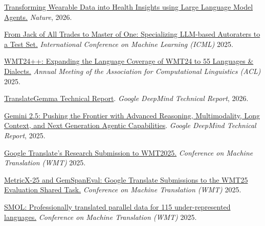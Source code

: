 
\href{https://www.nature.com/articles/s41467-025-67922-y_reference.pdf}{Transforming Wearable Data into Health Insights using Large Language Model Agents.} \emph{Nature}, 2026.

\href{https://openreview.net/pdf?id=Y0Kxvmjkmh}{From Jack of All Trades to Master of One: Specializing LLM-based Autoraters to a Test Set.} \emph{International Conference on Machine Learning (ICML)} 2025.

\href{https://aclanthology.org/2025.findings-acl.634.pdf}{WMT24++: Expanding the Language Coverage of WMT24 to 55 Languages \& Dialects.} \emph{Annual Meeting of the Association for Computational Linguistics (ACL)} 2025.

\href{https://arxiv.org/pdf/2601.09012}{TranslateGemma Technical Report}. \emph{Google DeepMind Technical Report}, 2026.

\href{https://arxiv.org/pdf/2507.06261}{Gemini 2.5: Pushing the Frontier with Advanced Reasoning, Multimodality, Long Context, and Next Generation Agentic Capabilities}. \emph{Google DeepMind Technical Report}, 2025.

\href{https://aclanthology.org/2025.wmt-1.48.pdf}{Google Translate’s Research Submission to WMT2025.} \emph{Conference on Machine Translation (WMT)} 2025.

\href{https://aclanthology.org/2025.wmt-1.70.pdf}{MetricX-25 and GemSpanEval: Google Translate Submissions to the WMT25 Evaluation Shared Task.} \emph{Conference on Machine Translation (WMT)} 2025.

\href{https://aclanthology.org/2025.wmt-1.85.pdf}{SMOL: Professionally translated parallel data for 115 under-represented languages.} \emph{Conference on Machine Translation (WMT)} 2025.

